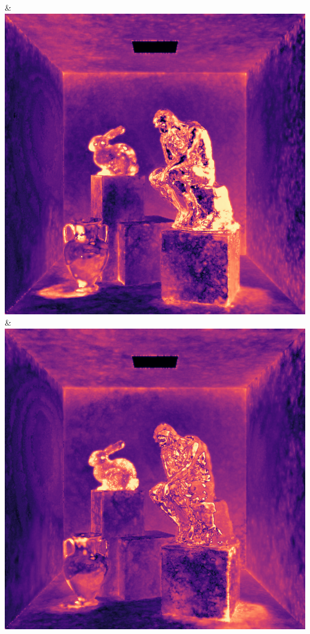 & \includegraphics[width=\linewidth]{figures/py/tests/path_termination/1stvert_1spp_thinker_flip.png}
& \includegraphics[width=\linewidth]{figures/py/tests/path_termination/1stdiff_1spp_thinker_flip.png}
